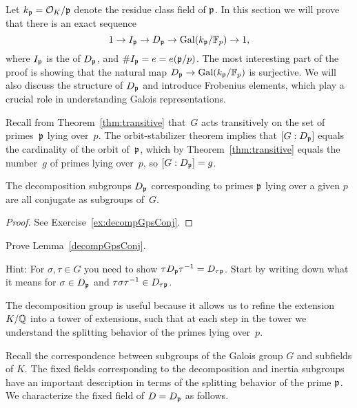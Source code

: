 Let $k_{\mathfrak{p}} = \mathcal{O}_K/\mathfrak{p}$ denote the residue class field of $\mathfrak{p}$.
In this section we will prove that there is an exact sequence
$$
  1\to I_{\mathfrak{p}} \to D_{\mathfrak{p}} \to \operatorname{Gal}(k_{\mathfrak{p}}/\mathbb{F}_p)\to 1,
$$
where $I_{\mathfrak{p}}$ is the  of $D_{\mathfrak{p}}$, and
$\#I_{\mathfrak{p}}=e = e(\mathfrak{p}/p)$.
The most interesting part of the proof is
showing that the natural map $D_{\mathfrak{p}}\to  \operatorname{Gal}(k_{\mathfrak{p}}/\mathbb{F}_p)$
is surjective. We will also discuss the structure of $D_{\mathfrak{p}}$ and introduce
Frobenius elements, which play a crucial role in understanding Galois
representations.


Recall from Theorem~\ref{thm:transitive}
that~$G$ acts transitively on the set of primes~$\mathfrak{p}$ lying
over~$p$.  The orbit-stabilizer theorem implies that $[G:D_{\mathfrak{p}}]$ equals the cardinality of the
orbit of~$\mathfrak{p}$, which by Theorem~\ref{thm:transitive}
equals the number~$g$ of primes lying over~$p$, so $[G:D_{\mathfrak{p}}]=g$.

\begin{lemma}\label{decompGpsConj}
The decomposition subgroups $D_{\mathfrak{p}}$ corresponding to primes $\mathfrak{p}$
lying over a given $p$ are all conjugate as subgroups of~$G$.
\end{lemma}
\begin{proof}
See Exercise~\ref{ex:decompGpsConj}.
\end{proof}

\begin{exercise}\label{ex:decompGpsConj}
Prove Lemma~\ref{decompGpsConj}.

Hint: For $\sigma,\tau\in G$ you need to show $\tau D_{\mathfrak{p}} \tau^{-1} = D_{\tau\mathfrak{p}}$.
Start by writing down what it means for $\sigma\in D_{\mathfrak{p}}$
and $\tau\sigma\tau^{-1}\in D_{\tau\mathfrak{p}}$.

\end{exercise}

The decomposition group is useful because it allows us
to refine the extension $K/\mathbb{Q}$ into a tower of extensions, such that at
each step in the tower we understand the splitting behavior
of the primes lying over~$p$.


Recall the correspondence between subgroups of the Galois group
$G$ and subfields of $K$. The fixed fields corresponding to the
decomposition and inertia subgroups have an important description
in terms of the splitting behavior of the prime $\mathfrak{p}$.
We characterize the fixed field of $D=D_{\mathfrak{p}}$ as follows.

